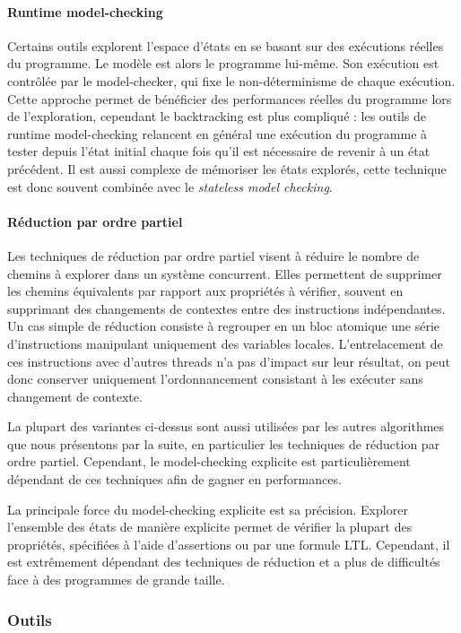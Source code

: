 \paragraph{Runtime model-checking}
Certains outils explorent l'espace d'états en se basant sur des
exécutions réelles du programme. Le modèle est alors le programme lui-même. Son exécution est contrôlée par le model-checker, qui fixe le
non-déterminisme de chaque exécution. Cette approche permet de
bénéficier des performances réelles du programme lors de l'exploration,
cependant le backtracking est plus compliqué : les outils de runtime
model-checking relancent en général une exécution du programme à tester
depuis l'état initial chaque fois qu'il est nécessaire de revenir à un
état précédent. Il est aussi complexe de mémoriser les états explorés,
cette technique est donc souvent combinée avec le \emph{stateless model
checking}.

\paragraph{Réduction par ordre partiel}
Les techniques de réduction par ordre partiel visent à réduire le nombre de
chemins à explorer dans un système concurrent. Elles permettent de supprimer les
chemins équivalents par rapport aux propriétés à vérifier, souvent en supprimant
des changements de contextes entre des instructions indépendantes. Un cas simple
de réduction consiste à regrouper en un bloc atomique une série d'instructions
manipulant uniquement des variables locales. L'entrelacement de ces instructions
avec d'autres threads n'a pas d'impact sur leur résultat, on peut donc conserver
uniquement l'ordonnancement consistant à les exécuter sans changement de
contexte.

La plupart des variantes ci-dessus sont aussi utilisées par les autres
algorithmes que nous présentons par la suite, en particulier les
techniques de réduction par ordre partiel. Cependant, le model-checking
explicite est particulièrement dépendant de ces techniques afin de
gagner en performances.

La principale force du model-checking explicite est sa précision. Explorer
l'ensemble des états de manière explicite permet de vérifier la plupart des
propriétés, spécifiées à l'aide d'assertions ou par une formule \ac{LTL}. Cependant,
il est extrêmement dépendant des techniques de réduction et a plus de
difficultés face à des programmes de grande taille.

\subsubsection{Outils}

